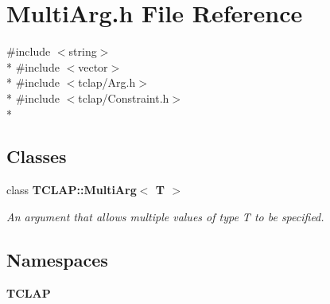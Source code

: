 \section{Multi\+Arg.\+h File Reference}
\label{MultiArg_8h}
{\ttfamily \#include $<$string$>$}\\*
{\ttfamily \#include $<$vector$>$}\\*
{\ttfamily \#include $<$tclap/\+Arg.\+h$>$}\\*
{\ttfamily \#include $<$tclap/\+Constraint.\+h$>$}\\*
\subsection*{Classes}
\begin{DoxyCompactItemize}
\item 
class {\bf T\+C\+L\+A\+P\+::\+Multi\+Arg$<$ T $>$}
\begin{DoxyCompactList}\small\item\em An argument that allows multiple values of type T to be specified. \end{DoxyCompactList}\end{DoxyCompactItemize}
\subsection*{Namespaces}
\begin{DoxyCompactItemize}
\item 
 {\bf T\+C\+L\+A\+P}
\end{DoxyCompactItemize}

